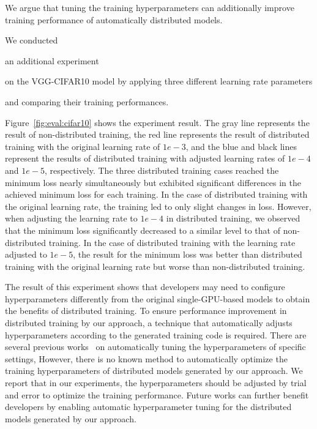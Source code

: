 \begin{inred}
We argue that tuning the training hyperparameters can additionally improve
training performance of automatically distributed models.
\end{inred}
We conducted \begin{inred}an additional experiment\end{inred} on the VGG-CIFAR10 
model by applying three different learning rate parameters 
\begin{inred}and comparing their training performances.\end{inred} 
Figure~\ref{fig:eval:cifar10} shows the experiment result.
The gray line represents the result of non-distributed training, the red line
represents the result of distributed training with the original learning rate
of $1e-3$, and the blue and black lines represent the results of distributed
training with adjusted learning rates of $1e-4$ and $1e-5$, respectively.
The three distributed training cases reached the minimum loss nearly
simultaneously but exhibited significant differences in the
achieved minimum loss for each training.
In the case of distributed training with the original learning rate, the
training led to only slight changes in loss.
However, when adjusting the learning rate to $1e-4$ in distributed training, 
we observed that the minimum loss significantly decreased to a similar level
to that of non-distributed training.
In the case of distributed training with the learning rate adjusted to $1e-5$,
the result for the minimum loss was better than distributed training with the
original learning rate but worse than non-distributed training.

\begin{inred}
The result of this experiment shows that developers may need to configure
hyperparameters differently from the original single-GPU-based models to
obtain the benefits of distributed training.
To ensure performance improvement in distributed training by our approach,
a technique that automatically adjusts hyperparameters according to the generated
training code is required.
There are several previous works~\cite{pmlr-v33-yogatama14}\cite{autohyper-rl}\cite{autotune}
on automatically tuning the hyperparameters of specific settings,
However, there is no known method to automatically optimize the training hyperparameters
of distributed models generated by our approach.
We report that in our experiments, the hyperparameters should be adjusted
by trial and error to optimize the training performance.
Future works can further benefit developers by enabling automatic
hyperparameter tuning for the distributed models generated by our approach.
\end{inred}

